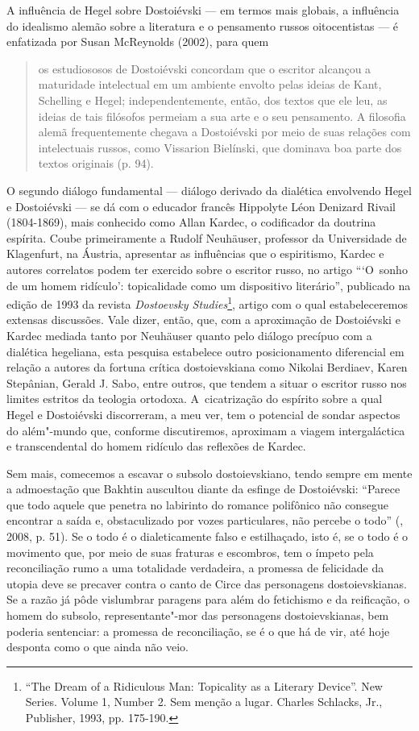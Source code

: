 A influência de Hegel sobre Dostoiévski --- em termos mais globais, a
influência do idealismo alemão sobre a literatura e o pensamento russos
oitocentistas --- é enfatizada por Susan McReynolds (2002), para quem

\begin{quote}
os estudiososos de Dostoiévski concordam que o escritor alcançou a
maturidade intelectual em um ambiente envolto pelas ideias de Kant,
Schelling e Hegel; independentemente, então, dos textos que ele leu, as
ideias de tais filósofos permeiam a sua arte e o seu pensamento. A
filosofia alemã frequentemente chegava a Dostoiévski por meio de suas
relações com intelectuais russos, como Vissarion Bielínski, que dominava
boa parte dos textos originais (p. 94).
\end{quote}

O segundo diálogo fundamental --- diálogo derivado da dialética
envolvendo Hegel e Dostoiévski --- se dá com o educador francês Hippolyte
Léon Denizard Rivail (1804-1869), mais conhecido como Allan Kardec, o
codificador da doutrina espírita. Coube primeiramente a Rudolf
Neuhäuser, professor da Universidade de Klagenfurt, na Áustria,
apresentar as influências que o espiritismo, Kardec e autores correlatos
podem ter exercido sobre o escritor russo, no artigo ```O~sonho de um
homem ridículo': topicalidade como um dispositivo literário'', publicado
na edição de 1993 da revista \emph{Dostoevsky Studies}\footnote{``The
  Dream of a Ridiculous Man: Topicality as a Literary Device''. New
  Series. Volume 1, Number 2. Sem menção a lugar. Charles Schlacks, Jr.,
  Publisher, 1993, pp. 175-190.}, artigo com o qual estabeleceremos
extensas discussões. Vale dizer, então, que, com a aproximação de
Dostoiévski e Kardec mediada tanto por Neuhäuser quanto pelo diálogo
precípuo com a dialética hegeliana, esta pesquisa estabelece outro
posicionamento diferencial em relação a autores da fortuna crítica
dostoievskiana como Nikolai Berdiaev, Karen Stepânian, Gerald J. Sabo,
entre outros, que tendem a situar o escritor russo nos limites estritos
da teologia ortodoxa. A~cicatrização do espírito sobre a qual Hegel e
Dostoiévski discorreram, a meu ver, tem o potencial de sondar aspectos
do além"-mundo que, conforme discutiremos, aproximam a viagem
intergaláctica e transcendental do homem ridículo das reflexões de
Kardec.

Sem mais, comecemos a escavar o subsolo dostoievskiano, tendo sempre em
mente a admoestação que Bakhtin auscultou diante da esfinge de
Dostoiévski: ``Parece que todo aquele que penetra no labirinto do
romance polifônico não consegue encontrar a saída e, obstaculizado por
vozes particulares, não percebe o todo'' (, 2008, p. 51). Se o
todo é o dialeticamente falso e estilhaçado, isto é, se o todo é o
movimento que, por meio de suas fraturas e escombros, tem o ímpeto pela
reconciliação rumo a uma totalidade verdadeira, a promessa de felicidade
da utopia deve se precaver contra o canto de Circe das personagens
dostoievskianas. Se a razão já pôde vislumbrar paragens para além do
fetichismo e da reificação, o homem do subsolo, representante"-mor das
personagens dostoievskianas, bem poderia sentenciar: a promessa de
reconciliação, se é o que há de vir, até hoje desponta como o que ainda
não veio.

